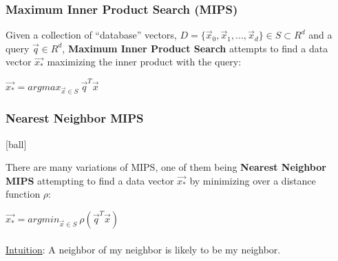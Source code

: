 \documentclass{beamer}
\begin{document}

\begin{frame}[fragile]
\begin{itemize}
\frametitle{Maximum Inner Product Search (MIPS)}

\item Given a collection of “database” vectors, $D = \{\overrightarrow{x}_{0}, \overrightarrow{x}_{1}, ..., \overrightarrow{x}_{d} \} \in S \subset R^{d}$ and a query $\overrightarrow{q} \in R^{d}$, \textbf{Maximum Inner Product Search} attempts to find a data vector $\overrightarrow{x_{*}}$ maximizing the inner product with the query:

\begin{center}
    \item[] $\overrightarrow{x_{*}} = argmax_{\overrightarrow{x} \in S} \ \overrightarrow{q}^T \overrightarrow{x} $
\end{center}

\end{itemize}
\end{frame}


\begin{frame}[fragile]
\begin{itemize}
\frametitle{Nearest Neighbor MIPS}
[ball]

\item There are many variations of MIPS, one of them being \textbf{Nearest Neighbor MIPS} attempting to find a data vector $\overrightarrow{x_{*}}$ by minimizing over a distance function $\rho$:

\begin{center}
    \item[] $\overrightarrow{x_{*}} = argmin_{\overrightarrow{x} \in S} \ \rho(\overrightarrow{q}^T \overrightarrow{x}) $ \\~\\ 
    \underline{Intuition}: A neighbor of my neighbor is likely to be my neighbor. 
\end{center}

\end{itemize}
\end{frame}
\end{document}

